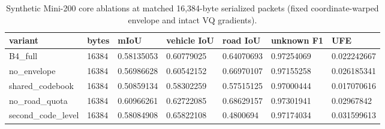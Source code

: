 \begin{table}[t]
\centering
\caption{Synthetic Mini-200 core ablations at matched 16,384-byte serialized packets (fixed coordinate-warped envelope and intact VQ gradients).}
\label{tab:ablations}
\scriptsize
\setlength{\tabcolsep}{3pt}
\begin{tabular}{lllllll}
\toprule
variant & bytes & mIoU & vehicle IoU & road IoU & unknown F1 & UFE \\
\midrule
B4\_full & 16384 & 0.58135053 & 0.60779025 & 0.64070693 & 0.97254069 & 0.022242667 \\
no\_envelope & 16384 & 0.56986628 & 0.60542152 & 0.66970107 & 0.97155258 & 0.026185341 \\
shared\_codebook & 16384 & 0.50859134 & 0.58302259 & 0.57515125 & 0.97000444 & 0.017070616 \\
no\_road\_quota & 16384 & 0.60966261 & 0.62722085 & 0.68629157 & 0.97301941 & 0.02967842 \\
second\_code\_level & 16384 & 0.58084908 & 0.65822108 & 0.4800694 & 0.97174034 & 0.031599613 \\
\bottomrule
\end{tabular}
\end{table}
